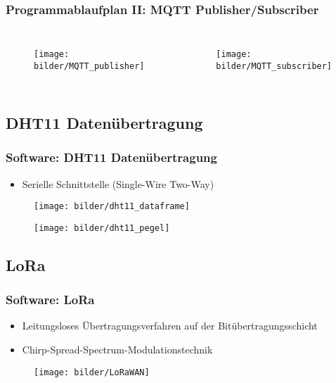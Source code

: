 \documentclass[12pt,utf8]{beamer}
\begin{document}
\begin{frame}
\frametitle{Programmablaufplan II: MQTT Publisher/Subscriber}
\begin{columns}
\begin{figure}
\texttt{[image: bilder/MQTT\_publisher]}
\end{figure}
\begin{figure}
 \texttt{[image: bilder/MQTT\_subscriber]}
\end{figure}
\end{columns}
\end{frame}

\subsection{DHT11 Datenübertragung}
\begin{frame}
\frametitle{Software: DHT11 Datenübertragung}
\begin{itemize}
\item Serielle Schnittstelle (Single-Wire Two-Way)
\end{itemize}
\begin{figure}
 \texttt{[image: bilder/dht11\_dataframe]}
\end{figure}
\begin{figure}
 \texttt{[image: bilder/dht11\_pegel]}
\end{figure}
\end{frame}

\subsection{LoRa}
\begin{frame}
\frametitle{Software: LoRa}
\begin{itemize}
\item Leitungsloses Übertragungsverfahren auf der Bitübertragungsschicht
\item Chirp-Spread-Spectrum-Modulationstechnik

\end{itemize}
\begin{figure}
 \texttt{[image: bilder/LoRaWAN]}
\end{figure}
\end{frame}
\end{document}
